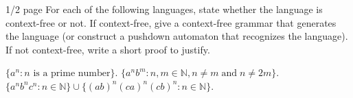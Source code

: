 \documentclass[solution, letterpaper]{cs121}
\begin{document}





 {1/2 page}
For each of the following languages, state whether the language is context-free or not. If context-free, give a context-free grammar that generates the language (or construct a pushdown automaton that recognizes the language). If not context-free, write a short proof to justify.

\subproblem $\{a^{n} : n \text{ is a prime number}\}$. 
\subproblem $\{a^nb^m : n,m\in \mathbb{N},  n \neq m\; \textrm{and}\; n \neq 2m\}$.
\subproblem
$\{a^{n}b^{n}c^{n} : n\in\mathbb{N}\} \cup \{(ab)^n(ca)^n(cb)^n : n\in\mathbb{N}\}$. 
\end{document}
